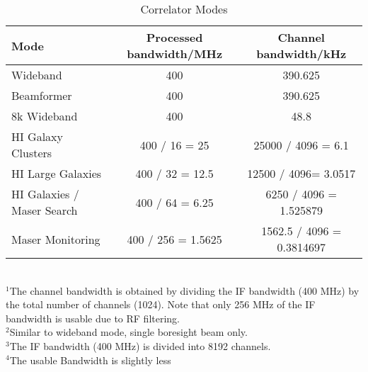 \begin{table*}
\caption{Correlator Modes}
\begin{tabular}{lcc}
\textbf{Mode} & \textbf{Processed bandwidth/MHz} & \textbf{Channel bandwidth/kHz}  \\
\hline
Wideband   & 400 & 390.625\footnotemark[1]\\
Beamformer & 400 & 390.625\footnotemark[2]\\
8k Wideband & 400 & 48.8\footnotemark[3]\\
HI Galaxy Clusters & 400 / 16 = 25  & 25000 / 4096 = 6.1  \\
HI Large Galaxies  & 400 / 32 = 12.5 & 12500 / 4096= 3.0517 \\
HI Galaxies / Maser Search  & 400 / 64 = 6.25\footnotemark[4]  &  6250 / 4096 = 1.525879 \\
Maser Monitoring & 400 / 256 = 1.5625 & 1562.5 / 4096 = 0.3814697\\
\hline

\end{tabular}
\\
$^1$The channel bandwidth is obtained by dividing the IF  bandwidth (400 MHz) by the total number of channels (1024).  Note  that only 256 MHz of the IF bandwidth is usable due to RF filtering.\\
$^2$Similar to wideband mode, single boresight beam only.\\
$^3$The IF bandwidth (400 MHz) is divided into 8192 channels.\\
$^4$The usable Bandwidth is slightly less\\
\label{table:modes}
\end{table*}
